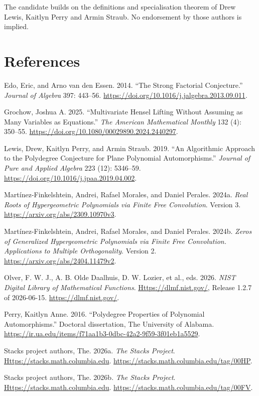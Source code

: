 \documentclass[
]{article}
\newlength{\cslhangindent}
\newenvironment{CSLReferences}[2] %
 {\begin{list}{}{%
  \setlength{\itemindent}{0pt}
  \setlength{\leftmargin}{0pt}
  \setlength{\parsep}{0pt}
  \ifodd #1
   \setlength{\leftmargin}{\cslhangindent}
   \setlength{\itemindent}{-1\cslhangindent}
  \fi
  \setlength{\itemsep}{#2\baselineskip}}}
 {\end{list}}
\begin{document}
The candidate builds on the definitions and specialisation theorem of
Drew Lewis, Kaitlyn Perry and Armin Straub. No endorsement by those
authors is implied.

\section*{References}\label{references}

\protect{}\label{refs}
\begin{CSLReferences}{1}{1}
Edo, Eric, and Arno van den Essen. 2014. {``The {Strong Factorial
Conjecture}.''} \emph{Journal of Algebra} 397: 443--56.
\url{https://doi.org/10.1016/j.jalgebra.2013.09.011}.

Grochow, Joshua A. 2025. {``Multivariate {Hensel} Lifting Without
Assuming as Many Variables as Equations.''} \emph{The American
Mathematical Monthly} 132 (4): 350--55.
\url{https://doi.org/10.1080/00029890.2024.2440297}.

Lewis, Drew, Kaitlyn Perry, and Armin Straub. 2019. {``An Algorithmic
Approach to the {Polydegree Conjecture} for Plane Polynomial
Automorphisms.''} \emph{Journal of Pure and Applied Algebra} 223 (12):
5346--59. \url{https://doi.org/10.1016/j.jpaa.2019.04.002}.

Martínez-Finkelshtein, Andrei, Rafael Morales, and Daniel Perales.
2024a. \emph{Real Roots of Hypergeometric Polynomials via Finite Free
Convolution}. Version 3. \url{https://arxiv.org/abs/2309.10970v3}.

Martínez-Finkelshtein, Andrei, Rafael Morales, and Daniel Perales.
2024b. \emph{Zeros of Generalized Hypergeometric Polynomials via Finite
Free Convolution. Applications to Multiple Orthogonality}. Version 2.
\url{https://arxiv.org/abs/2404.11479v2}.

Olver, F. W. J., A. B. Olde Daalhuis, D. W. Lozier, et al., eds. 2026.
\emph{{NIST Digital Library of Mathematical Functions}}.
\href{https://dlmf.nist.gov/}{Https://dlmf.nist.gov/}, Release 1.2.7 of
2026-06-15. \url{https://dlmf.nist.gov/}.

Perry, Kaitlyn Anne. 2016. {``Polydegree Properties of Polynomial
Automorphisms.''} Doctoral dissertation, The University of Alabama.
\url{https://ir.ua.edu/items/f71aa1b3-0dbc-42a2-9f59-3f01eb1a5529}.

Stacks project authors, The. 2026a. \emph{The Stacks Project}.
\href{https://stacks.math.columbia.edu}{Https://stacks.math.columbia.edu}.
\url{https://stacks.math.columbia.edu/tag/00HP}.

Stacks project authors, The. 2026b. \emph{The Stacks Project}.
\href{https://stacks.math.columbia.edu}{Https://stacks.math.columbia.edu}.
\url{https://stacks.math.columbia.edu/tag/00FV}.

\end{CSLReferences}
\end{document}
